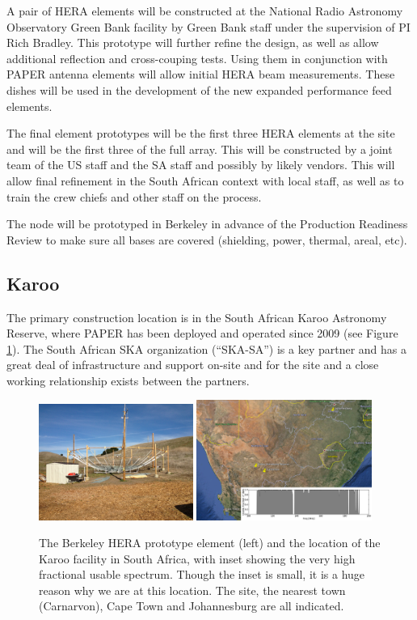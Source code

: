 \documentclass[preprint]{aastex}
\begin{document}
A pair of HERA elements will be constructed at the National Radio Astronomy Observatory Green Bank
facility by Green Bank staff under the supervision of PI Rich Bradley.  This prototype will further refine
the design, as well as allow additional reflection and cross-couping tests.  Using them in conjunction 
with PAPER antenna elements will allow initial HERA beam measurements.  These dishes will be used
in the development of the new expanded performance feed elements.

The final element prototypes will be the first three HERA elements at the site and will be the first three of the full
array.  This will be constructed by a joint team of the US staff and the SA staff and possibly by likely vendors.
This will allow final refinement in the South African context with local staff, as well as to train the crew chiefs
and other staff on the process.

The node will be prototyped in Berkeley in advance of the Production Readiness Review to make sure
all bases are covered (shielding, power, thermal, areal, etc).  

\subsection{Karoo}
The primary construction location is in the South African Karoo Astronomy Reserve, where PAPER has been deployed
and operated since 2009 (see Figure \ref{fig:heraclesANDkaroo}).  The South African SKA organization (``SKA-SA'') is a key partner and has a great deal of
infrastructure and support on-site and for the site and a close working relationship exists between the partners.

\begin{figure}[htb]
\centering
\includegraphics[width=0.45\textwidth]{plots/heracles.png}
\includegraphics[width=0.51\textwidth]{plots/karoo.png}
\caption{\small The Berkeley HERA prototype element (left) and the location of the Karoo facility in South Africa, with inset showing
the very high fractional usable spectrum.  Though the inset is small, it is a huge reason why we are at this location.  The site, the nearest town (Carnarvon), Cape Town and Johannesburg are all indicated.}
\label{fig:heraclesANDkaroo}
\end{figure}
\end{document}
